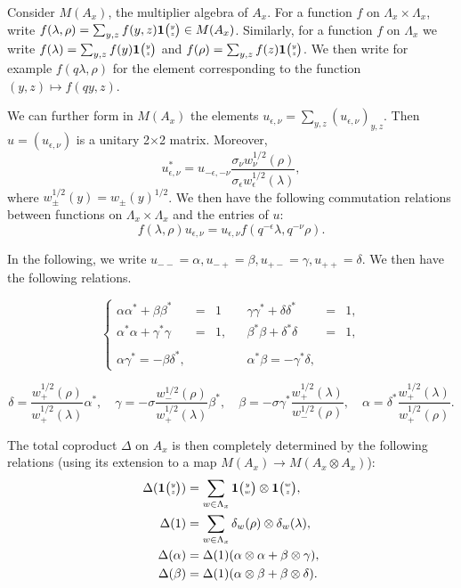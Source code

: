 Consider $M(A_x)$, the multiplier algebra of $A_x$. For a function $f$ on $\Lambda_x\times \Lambda_x$, write $f(\lambda,\rho) = \sum_{y,z} f(y,z)\mathbf{1}{\tiny {\begin{pmatrix} y\\z\end{pmatrix}}} \in M(A_x)$. Similarly, for a function $f$ on $\Lambda_x$ we write $f(\lambda) = \sum_{y,z} f(y)\mathbf{1}{\tiny {\begin{pmatrix} y\\z\end{pmatrix}}}$ and $f(\rho) = \sum_{y,z}f(z)\mathbf{1}{\tiny {\begin{pmatrix} y\\z\end{pmatrix}}}$. We then write for example $f(q\lambda,\rho)$ for the element corresponding to the function $(y,z)\mapsto f(qy,z)$.

We can further form in $M(A_x)$ the elements $u_{\epsilon,\nu} = \sum_{y,z} (u_{\epsilon,\nu})_{y,z}$. Then $u=(u_{\epsilon,\nu})$ is a unitary 2$\times$2 matrix. Moreover, \begin{equation}\label{EqAdju}u_{\epsilon,\nu}^* = u_{-\epsilon,-\nu}\frac{ \sigma_{\nu}w_{\nu}^{1/2}(\rho)}{\sigma_{\epsilon}w_{\epsilon}^{1/2}(\lambda)} ,\end{equation} where $w_{\pm}^{1/2}(y) = w_{\pm}(y)^{1/2}$.  We then have the following commutation relations between functions on $\Lambda_x\times \Lambda_x$ and the entries of $u$: \begin{equation}\label{EqGradu} f(\lambda,\rho)u_{\epsilon,\nu} = u_{\epsilon,\nu}f(q^{-\epsilon}\lambda,q^{-\nu}\rho).\end{equation}

In the following, we write $u_{--}=\alpha, u_{-+}= \beta, u_{+-}=\gamma,u_{++}=\delta$. We then have the following relations.

\begin{equation}\label{EqId1}\left\{\begin{array}{lllllll} \alpha\alpha^* + \beta\beta^* &=& 1 &&  \gamma\gamma^* + \delta\delta^* &=& 1,\\ \alpha^*\alpha+ \gamma^*\gamma &=&1,&&\beta^*\beta+ \delta^*\delta &=& 1,\\ \\ \alpha \gamma^* = -\beta \delta^*, &&&& \alpha^*\beta = -\gamma^*\delta, \end{array}\right.\end{equation}

\begin{equation}\label{EqId2} \delta =  \frac{w_+^{1/2}(\rho)}{w_+^{1/2}(\lambda)}\alpha^*, \quad \gamma=  -\sigma \frac{w_{-}^{1/2}(\rho)}{w_+^{1/2}(\lambda)}\beta^*,\quad  \beta = -\sigma \gamma^*\frac{w_+^{1/2}(\lambda)}{w_{-}^{1/2}(\rho)}, \quad  \alpha = \delta^* \frac{w_+^{1/2}(\lambda)}{w_+^{1/2}(\rho)}.\end{equation}

The total coproduct $\Delta$ on $A_x$ is then completely determined by the following relations (using its extension to a map $M(A_x) \rightarrow M(A_x\otimes A_x)$): \begin{align*}
 \Delta(\mathbf{1}{\tiny {\begin{pmatrix} y\\z\end{pmatrix}}}) &= \sum_{w\in \Lambda_x} \mathbf{1}{\tiny {\begin{pmatrix} y\\w\end{pmatrix}}}\otimes \mathbf{1}{\tiny {\begin{pmatrix} w\\z\end{pmatrix}}},\\
 \Delta(1) &=  \sum_{w\in \Lambda_x} \delta_w(\rho)  \otimes \delta_w(\lambda),\\
\Delta(\alpha) &= \Delta(1)(\alpha \otimes \alpha + \beta \otimes \gamma),\\
 \Delta(\beta) &= \Delta(1)( \alpha \otimes \beta + \beta \otimes \delta).\\
  \end{align*} 

